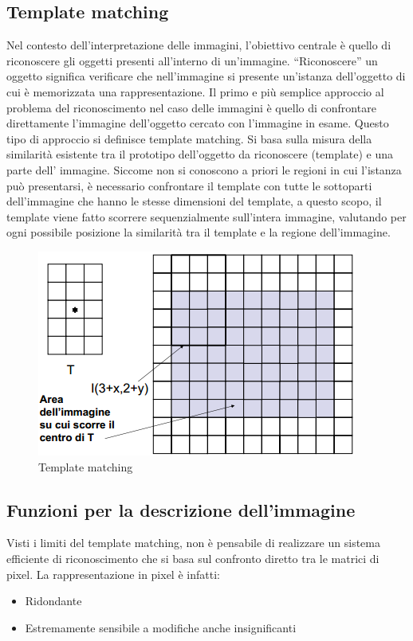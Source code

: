 \subsection{Template matching} 
Nel contesto dell'interpretazione delle immagini, l'obiettivo centrale è
quello di  riconoscere gli oggetti presenti all'interno di  un’immagine.
``Riconoscere'' un oggetto significa verificare che nell'immagine si presente
un'istanza  dell'oggetto di cui è memorizzata una rappresentazione. Il primo e
più semplice approccio al problema  del riconoscimento nel caso delle immagini
è  quello di confrontare direttamente l'immagine  dell'oggetto cercato con
l'immagine in esame. Questo tipo di approccio si definisce template matching.
Si basa sulla misura della similarità  esistente tra il prototipo dell'oggetto
da  riconoscere (template) e una parte dell'  immagine. Siccome non si
conoscono a priori le regioni in cui l'istanza può presentarsi, è necessario
confrontare il template con tutte le sottoparti  dell'immagine che hanno le
stesse  dimensioni del template, a questo scopo, il template viene fatto
scorrere sequenzialmente sull'intera  immagine, valutando per ogni possibile
posizione la similarità tra il template e la  regione dell'immagine.


\begin{figure}[h]
\centering
\includegraphics[width=.8\textwidth]{img/template-matching.png}
\caption{Template matching}
\label{fig:template-matching}
\end{figure}
\subsection{Funzioni per la descrizione dell'immagine}

Visti i limiti del template matching, non è 
pensabile di realizzare un sistema efficiente 
di riconoscimento che si basa sul confronto 
diretto tra le matrici di pixel.
La rappresentazione in pixel è infatti:
\begin{itemize}
\item Ridondante
\item Estremamente sensibile a modifiche anche 
insignificanti
\end{itemize}

